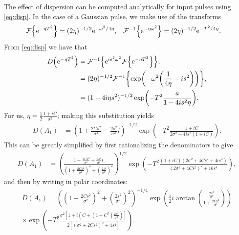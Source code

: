 The effect of dispersion can be computed analytically for input pulses using \eqref{eq:disp}. In the case of a Gaussian pulse, we make use of the transforms \cite{debnath, gradshteyn}
\begin{align*}
\FT{\textrm{e}^{-\eta T^2}} &= (2 \eta)^{-1/2}\textrm{e}^{-\omega^2/4\eta},& \FTi{\textrm{e}^{-\eta \omega^2}} &= (2 \eta)^{-1/2}\textrm{e}^{-T^2/4\eta}.
\end{align*}
From \eqref{eq:disp} we have that
\begin{align*}
D \left( \textrm{e}^{-\eta T^2} \right) &=\FTi{\textrm{e}^{i s^2 \omega^2} \FT{\textrm{e}^{-\eta T^2}}}, \\
&= (2 \eta)^{-1/2} \FTi{\exp \left( -\omega^2 \left( \frac{1}{4\eta} - i s^2 \right) \right)}, \\
&= (1 - 4 i \eta s^2)^{-1/2} \exp \left( -T^2 \frac{a}{1 - 4 i s^2 \eta} \right).
\end{align*}
For us, $\displaystyle \eta = \frac{1}{2} \frac{1 + i C}{\sigma^2}$; making this substitution yields
\begin{align*}
D(A_1) &= \left( 1 + \frac{2C s^2}{\sigma^2} - \frac{2s^2}{\sigma^2}i \right)^{-1/2} \exp \left( -T^2 \frac{1 + i C}{2\sigma^2 - 4 i s^2 (1 + i C)} \right).
\end{align*}
This can be greatly simplified by first rationalizing the denominators to give
\begin{align*}
D(A_1) &= \left( \frac{1 + \frac{2C s^2}{\sigma^2} + \frac{2s^2}{\sigma^2}i}{\left( 1 + \frac{2C s^2}{\sigma^2} \right)^2 + \left( \frac{2s^2}{\sigma^2} \right)^2} \right)^{1/2} \exp \left( -T^2 \frac{(1 + i C)(2\sigma^2 + 4 C s^2 + 4 i s^2)}{(2\sigma^2 + 4C s^2)^2 + 16s^4} \right),
\end{align*}
and then by writing in polar coordinates:
\begin{multline*}
D(A_1) = \left( \left( 1 + \frac{2C s^2}{\sigma^2} \right)^2 + \left( \frac{2s^2}{\sigma^2} \right)^2 \right)^{-1/4} \exp \left( \frac{1}{2} i \arctan \left( \frac{\frac{2s^2}{\sigma^2}}{1 + \frac{2C s^2}{\sigma^2}} \right) \right) \\
\times \exp \left( -T^2 \frac{\sigma^2 \left[ 1 + i \left( C + (1 + C^2) \frac{2s^2}{\sigma^2} \right) \right]}{2 \left[ (\sigma^2 + 2C s^2)^2 + 4s^4 \right]} \right).
\end{multline*}
